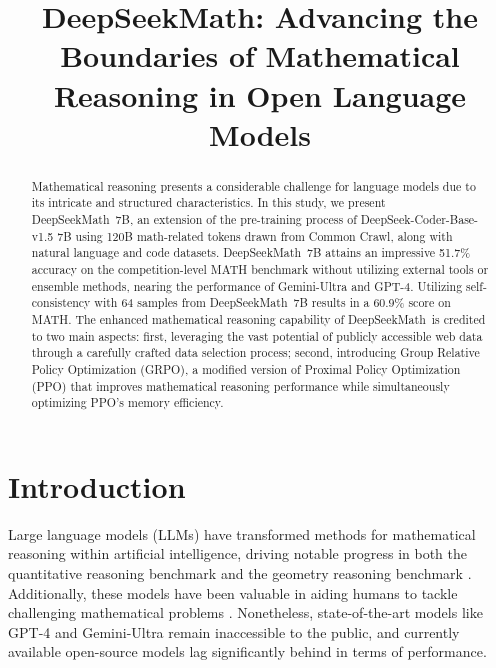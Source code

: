 \title{DeepSeekMath: Advancing the Boundaries of Mathematical Reasoning in Open Language Models}

\begin{abstract}
Mathematical reasoning presents a considerable challenge for language models due to its intricate and structured characteristics. In this study, we present DeepSeekMath~7B, an extension of the pre-training process of DeepSeek-Coder-Base-v1.5 7B using 120B math-related tokens drawn from Common Crawl, along with natural language and code datasets. DeepSeekMath~7B attains an impressive 51.7\% accuracy on the competition-level MATH benchmark without utilizing external tools or ensemble methods, nearing the performance of Gemini-Ultra and GPT-4. Utilizing self-consistency with 64 samples from DeepSeekMath~7B results in a 60.9\% score on MATH. The enhanced mathematical reasoning capability of DeepSeekMath~is credited to two main aspects: first, leveraging the vast potential of publicly accessible web data through a carefully crafted data selection process; second, introducing Group Relative Policy Optimization (GRPO), a modified version of Proximal Policy Optimization (PPO) that improves mathematical reasoning performance while simultaneously optimizing PPO's memory efficiency.
\end{abstract}

\section{Introduction}

Large language models (LLMs) have transformed methods for mathematical reasoning within artificial intelligence, driving notable progress in both the quantitative reasoning benchmark \citep{MATH} and the geometry reasoning benchmark \citep{trinh2024solving}. Additionally, these models have been valuable in aiding humans to tackle challenging mathematical problems \citep{tao}. Nonetheless, state-of-the-art models like GPT-4 \citep{gpt4} and Gemini-Ultra \citep{gemini} remain inaccessible to the public, and currently available open-source models lag significantly behind in terms of performance.

